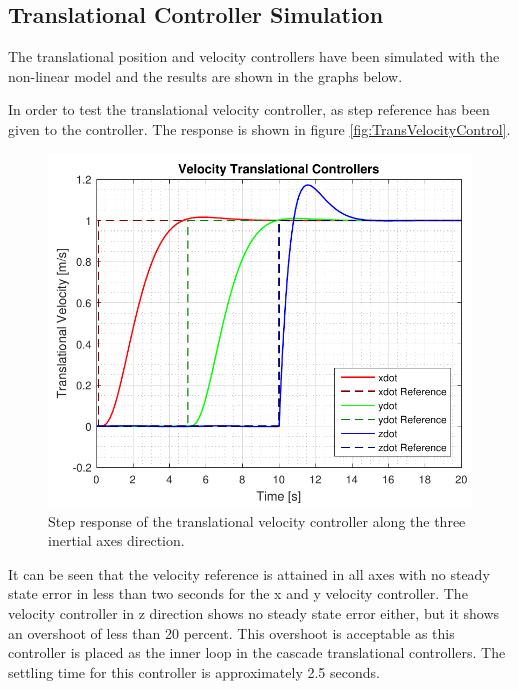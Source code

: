 \subsection{Translational Controller Simulation}
The translational position and velocity controllers have been simulated with the non-linear model and the results are shown in the graphs below. 

In order to test the translational velocity controller, as step reference has been given to the controller. The response is shown in figure \autoref{fig:TransVelocityControl}.
\begin{figure}[H]
	\centering
	\includegraphics[scale=0.65]{figures/simVelocityController}
	\caption{Step response of the translational velocity controller along the three inertial axes direction.}
	\label{fig:TransVelocityControl}
\end{figure}
It can be seen that the velocity reference is attained in all axes with no steady state error in less than two seconds for the x and y velocity controller. The velocity  controller in z direction shows no steady state error either, but it shows an overshoot of less than 20 percent. This overshoot is acceptable as this controller is placed as the inner loop in the cascade translational controllers. The settling time for this controller is approximately 2.5 seconds.

